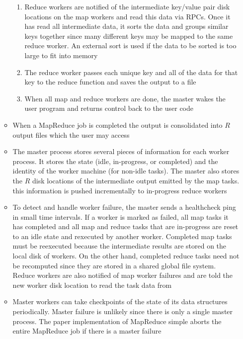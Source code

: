 \documentclass[a4paper]{article}
\begin{document}
\begin{itemize}
\begin{itemize}
\begin{enumerate}
\item Reduce workers are notified of the intermediate key/value pair disk locations on the map workers and read this data via RPCs. Once it has read all intermediate data, it sorts the data and groups similar keys together since many different keys may be mapped to the same reduce worker. An external sort is used if the data to be sorted is too large to fit into memory

\item The reduce worker passes each unique key and all of the data for that key to the reduce function and saves the output to a file 

\item When all map and reduce workers are done, the master wakes the user program and returns control back to the user code
\end{enumerate}

\item When a MapReduce job is completed the output is consolidated into $R$ output files which the user may access

\item The master process stores several pieces of information for each worker process. It stores the state (idle, in-progress, or completed) and the identity of the worker machine (for non-idle tasks). The master also stores the $R$ disk locations of the intermediate output emitted by the map tasks. this information is pushed incrementally to in-progress reduce workers

\item To detect and handle worker failure, the master sends a healthcheck ping in small time intervals. If a worker is marked as failed, all map tasks it has completed and all map and reduce tasks that are in-progress are reset to an idle state and rexecuted by another worker. Completed map tasks must be reexecuted because the intermediate results are stored on the local disk of workers. On the other hand, completed reduce tasks need not be recomputed since they are stored in a shared global file system. Reduce workers are also notified of map worker failures and are told the new worker disk location to read the task data from

\item Master workers can take checkpoints of the state of its data structures periodically. Master failure is unlikely since there is only a single master process. The paper implementation of MapReduce simple aborts the entire MapReduce job if there is a master failure


\end{itemize}
\end{itemize}
\end{document}
